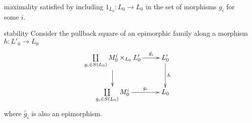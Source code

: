 \begin{frame}
\begin{block}{maximality}
satisfied by including $1_{L_0} : L_0 \rightarrow L_0$ in the set of morphisms $g_i$ for some $i$. 
\end{block}
\begin{block}{stability}
Consider the pullback square of an epimorphic family along a morphism $h:L'_0 \rightarrow L_0$
\begin{displaymath}
\xymatrix{
\coprod\limits_{g_i \in S(L_0)} M_0^i \times_{L_0} L'_0 \ar[r]^-{\tilde{g_i}} \ar[d]_{} & L'_0 \ar[d]^{h} \\
\coprod\limits_{g_i \in S(L_0)} M_0^i \ar[r]^-{g_i} & L_0
}
\end{displaymath}
where $\tilde{g_i}$ is also an epimorphism. 
\end{block}
\end{frame}